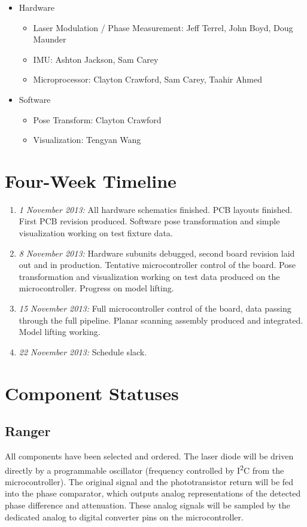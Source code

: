 \documentclass{article}
\begin{document}
\begin{itemize}
\item Hardware
  \begin{itemize}
  \item Laser Modulation / Phase Measurement: Jeff Terrel, John Boyd, Doug
    Maunder
  \item IMU: Ashton Jackson, Sam Carey
  \item Microprocessor: Clayton Crawford, Sam Carey, Taahir Ahmed
  \end{itemize}
\item Software
  \begin{itemize}
  \item Pose Transform: Clayton Crawford
  \item Visualization: Tengyan Wang
  \end{itemize}
\end{itemize}

\section{Four-Week Timeline}

\begin{enumerate}
\item \emph{1 November 2013:} All hardware schematics finished.  PCB layouts
  finished.  First PCB revision produced.  Software pose transformation and
  simple visualization working on test fixture data.
\item \emph{8 November 2013:} Hardware subunits debugged, second board revision
  laid out and in production.  Tentative microcontroller control of the board.
  Pose transformation and visualization working on test data produced on the
  microcontroller.  Progress on model lifting.
\item \emph{15 November 2013:} Full microcontroller control of the board, data
  passing through the full pipeline.  Planar scanning assembly produced and
  integrated.  Model lifting working.
\item \emph{22 November 2013:} Schedule slack.
\end{enumerate}

\section{Component Statuses}

\subsection{Ranger}
All components have been selected and ordered.  The laser diode will be driven
directly by a programmable oscillator (frequency controlled by
I\textsuperscript{2}C from the microcontroller).  The original signal and the
phototransistor return will be fed into the phase comparator, which outputs
analog representations of the detected phase difference and attenuation.  These
analog signals will be sampled by the dedicated analog to digital converter pins
on the microcontroller.
\end{document}
